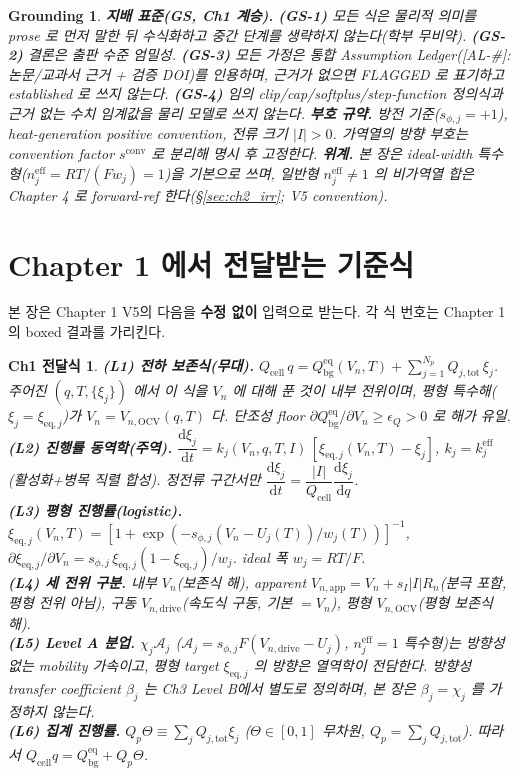 \documentclass[11pt,a4paper]{article}
\newtheorem*{groundingbox}{Grounding}
\newtheorem*{linkbox}{Ch1 전달식}
\newcommand{\dd}{\mathrm{d}}
\newcommand{\eff}{\mathrm{eff}}
\newcommand{\eq}{\mathrm{eq}}
\newcommand{\app}{\mathrm{app}}
\newcommand{\drive}{\mathrm{drive}}
\newcommand{\bg}{\mathrm{bg}}
\newcommand{\cell}{\mathrm{cell}}
\newcommand{\OCV}{\mathrm{OCV}}
\newcommand{\tot}{\mathrm{tot}}
\newcommand{\conv}{\mathrm{conv}}
\newcommand{\AL}[1]{\textsf{[AL-#1]}}
\begin{document}
\begin{groundingbox}
\textbf{지배 표준(GS, Ch1 계승).} \textbf{(GS-1)} 모든 식은 물리적 의미를 prose 로 먼저 말한 뒤 수식화하고
중간 단계를 생략하지 않는다(학부 무비약). \textbf{(GS-2)} 결론은 출판 수준 엄밀성. \textbf{(GS-3)} 모든 가정은
통합 Assumption Ledger(\AL{\#}: 논문/교과서 근거 + 검증 DOI)를 인용하며, 근거가 없으면 FLAGGED 로 표기하고
established 로 쓰지 않는다. \textbf{(GS-4)} 임의 clip/cap/softplus/step-function 정의식과 근거 없는 수치
임계값을 물리 모델로 쓰지 않는다. \textbf{부호 규약.} 방전 기준($s_{\phi,j}=+1$), heat-generation positive
convention, 전류 크기 $|I|>0$. 가역열의 방향 부호는 convention factor $s^{\conv}$ 로 분리해 명시 후 고정한다.
\textbf{위계.} 본 장은 \emph{ideal-width 특수형}($n_j^{\eff}=RT/(Fw_j)=1$)을 기본으로 쓰며, 일반형
$n_j^{\eff}\ne1$ 의 비가역열 합은 Chapter 4 로 forward-ref 한다(\S\ref{sec:ch2_irr}; V5 convention).
\end{groundingbox}

\tableofcontents
\newpage

\section{Chapter 1 에서 전달받는 기준식}\label{sec:ch2_inherit}
본 장은 Chapter 1 V5의 다음을 \textbf{수정 없이} 입력으로 받는다. 각 식 번호는
Chapter 1 의 boxed 결과를 가리킨다.
\begin{linkbox}
\textbf{(L1) 전하 보존식(무대).} $Q_\cell\,q=Q_\bg^{\eq}(V_n,T)+\sum_{j=1}^{N_p}Q_{j,\tot}\,\xi_j$. 주어진
$(q,T,\{\xi_j\})$ 에서 이 식을 $V_n$ 에 대해 푼 것이 내부 전위이며, 평형 특수해($\xi_j=\xi_{\eq,j}$)가
$V_n=V_{n,\OCV}(q,T)$ 다. 단조성 floor $\partial Q_\bg^{\eq}/\partial V_n\ge\epsilon_Q>0$ 로 해가 유일.\\
\textbf{(L2) 진행률 동역학(주역).} $\dfrac{\dd\xi_j}{\dd t}=k_j(V_n,q,T,I)\,[\xi_{\eq,j}(V_n,T)-\xi_j]$,
$k_j=k_j^{\eff}$(활성화+병목 직렬 합성). 정전류 구간서만 $\dfrac{\dd\xi_j}{\dd t}=\dfrac{|I|}{Q_\cell}\dfrac{\dd\xi_j}{\dd q}$.\\
\textbf{(L3) 평형 진행률(logistic).} $\xi_{\eq,j}(V_n,T)=[1+\exp(-s_{\phi,j}(V_n-U_j(T))/w_j(T))]^{-1}$,
$\partial\xi_{\eq,j}/\partial V_n=s_{\phi,j}\,\xi_{\eq,j}(1-\xi_{\eq,j})/w_j$. ideal 폭 $w_j=RT/F$.\\
\textbf{(L4) 세 전위 구분.} 내부 $V_n$(보존식 해), apparent $V_{n,\app}=V_n+s_I|I|R_n$(분극 포함, 평형
전위 아님), 구동 $V_{n,\drive}$(속도식 구동, 기본 $=V_n$), 평형 $V_{n,\OCV}$(평형 보존식 해).\\
\textbf{(L5) Level A 분업.} $\chi_j\mathcal A_j$ ($\mathcal A_j=s_{\phi,j}F(V_{n,\drive}-U_j)$, $n_j^{\eff}=1$
특수형)는 \emph{방향성 없는} mobility 가속이고, 평형 target $\xi_{\eq,j}$ 의 방향은 열역학이 전담한다.
방향성 transfer coefficient $\beta_j$ 는 Ch3 Level B에서 별도로 정의하며, 본 장은 $\beta_j=\chi_j$ 를 가정하지 않는다.\\
\textbf{(L6) 집계 진행률.} $Q_p\Theta\equiv\sum_jQ_{j,\tot}\xi_j$ ($\Theta\in[0,1]$ 무차원,
$Q_p=\sum_jQ_{j,\tot}$). 따라서 $Q_\cell q=Q_\bg^{\eq}+Q_p\Theta$.
\end{linkbox}
\end{document}
